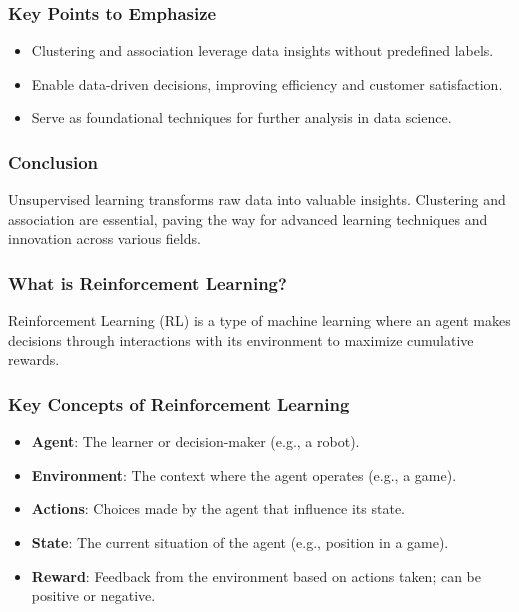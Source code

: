 \documentclass[aspectratio=169]{beamer}
\begin{document}
\begin{frame}[fragile]
    \frametitle{Key Points to Emphasize}
    \begin{itemize}
        \item Clustering and association leverage data insights without predefined labels.
        \item Enable data-driven decisions, improving efficiency and customer satisfaction.
        \item Serve as foundational techniques for further analysis in data science.
    \end{itemize}
\end{frame}

\begin{frame}[fragile]
    \frametitle{Conclusion}
    Unsupervised learning transforms raw data into valuable insights. Clustering and association are essential, paving the way for advanced learning techniques and innovation across various fields.
\end{frame}

\begin{frame}[fragile]
    \frametitle{What is Reinforcement Learning?}
    Reinforcement Learning (RL) is a type of machine learning where an agent makes decisions through interactions with its environment to maximize cumulative rewards.
\end{frame}

\begin{frame}[fragile]
    \frametitle{Key Concepts of Reinforcement Learning}
    \begin{itemize}
        \item \textbf{Agent}: The learner or decision-maker (e.g., a robot).
        \item \textbf{Environment}: The context where the agent operates (e.g., a game).
        \item \textbf{Actions}: Choices made by the agent that influence its state.
        \item \textbf{State}: The current situation of the agent (e.g., position in a game).
        \item \textbf{Reward}: Feedback from the environment based on actions taken; can be positive or negative.
    \end{itemize}
\end{frame}
\end{document}
